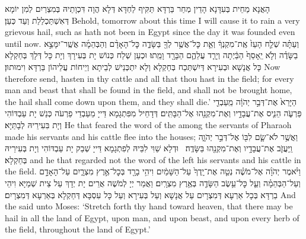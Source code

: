 {הָאֲנָא מַחֵית בְּעִדָּנָא הָדֵין מְחַר בַּרְדָּא תַּקִּיף לַחְדָּא דְּלָא הֲוָה דִּכְוָתֵיהּ בְּמִצְרַיִם לְמִן יוֹמָא דְּאִשְׁתַּכְלַלַת וְעַד כְּעַן׃}
{Behold, tomorrow about this time I will cause it to rain a very grievous hail, such as hath not been in Egypt since the day it was founded even until now.}{}
{וְעַתָּ֗ה שְׁלַ֤ח הָעֵז֙ אֶֽת־מִקְנְךָ֔ וְאֵ֛ת כׇּל־אֲשֶׁ֥ר לְךָ֖ בַּשָּׂדֶ֑ה כׇּל־הָאָדָ֨ם וְהַבְּהֵמָ֜ה אֲשֶֽׁר־יִמָּצֵ֣א בַשָּׂדֶ֗ה וְלֹ֤א יֵֽאָסֵף֙ הַבַּ֔יְתָה וְיָרַ֧ד עֲלֵהֶ֛ם הַבָּרָ֖ד וָמֵֽתוּ׃
}
{וּכְעַן שְׁלַח כְּנוֹשׁ יָת בְּעִירָךְ וְיָת כָּל דְּלָךְ בְּחַקְלָא כָּל אֲנָשָׁא וּבְעִירָא דְּיִשְׁתְּכַח בְּחַקְלָא וְלָא יִתְכְּנֵישׁ לְבֵיתָא וְיֵיחוֹת עֲלֵיהוֹן בַּרְדָּא וִימוּתוּן׃}
{Now therefore send, hasten in thy cattle and all that thou hast in the field; for every man and beast that shall be found in the field, and shall not be brought home, the hail shall come down upon them, and they shall die.’}{}
{הַיָּרֵא֙ אֶת־דְּבַ֣ר יְהֹוָ֔ה מֵֽעַבְדֵ֖י פַּרְעֹ֑ה הֵנִ֛יס אֶת־עֲבָדָ֥יו וְאֶת־מִקְנֵ֖הוּ אֶל־הַבָּתִּֽים׃
}
{דְּדָחֵיל מִפִּתְגָמָא דַּייָ מֵעַבְדֵי פַרְעֹה כְּנַשׁ יָת עַבְדּוֹהִי וְיָת בִּעִירֵיהּ לְבָתַּיָּא׃}
{He that feared the word of the \lord\space among the servants of Pharaoh made his servants and his cattle flee into the houses;}{}
{וַאֲשֶׁ֥ר לֹא־שָׂ֛ם לִבּ֖וֹ אֶל־דְּבַ֣ר יְהֹוָ֑ה וַֽיַּעֲזֹ֛ב אֶת־עֲבָדָ֥יו וְאֶת־מִקְנֵ֖הוּ בַּשָּׂדֶֽה׃ \petucha }
{וּדְלָא שַׁוִּי לִבֵּיהּ לְפִתְגָמָא דַּייָ שְׁבַק יָת עַבְדּוֹהִי וְיָת בְּעִירֵיהּ בְּחַקְלָא׃}
{and he that regarded not the word of the \lord\space left his servants and his cattle in the field.}{}
{וַיֹּ֨אמֶר יְהֹוָ֜ה אֶל־מֹשֶׁ֗ה נְטֵ֤ה אֶת־יָֽדְךָ֙ עַל־הַשָּׁמַ֔יִם וִיהִ֥י בָרָ֖ד בְּכׇל־אֶ֣רֶץ מִצְרָ֑יִם עַל־הָאָדָ֣ם וְעַל־הַבְּהֵמָ֗ה וְעַ֛ל כׇּל־עֵ֥שֶׂב הַשָּׂדֶ֖ה בְּאֶ֥רֶץ מִצְרָֽיִם׃
}
{וַאֲמַר יְיָ לְמֹשֶׁה אֲרֵים יָת יְדָךְ עַל צֵית שְׁמַיָּא וִיהֵי בַרְדָּא בְּכָל אַרְעָא דְּמִצְרָיִם עַל אֲנָשָׁא וְעַל בְּעִירָא וְעַל כָּל עִסְבָּא דְּחַקְלָא בְּאַרְעָא דְּמִצְרָיִם׃}
{And the \lord\space said unto Moses: ‘Stretch forth thy hand toward heaven, that there may be hail in all the land of Egypt, upon man, and upon beast, and upon every herb of the field, throughout the land of Egypt.’}{}
